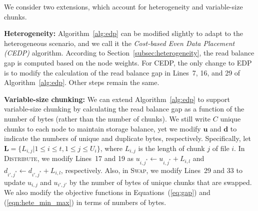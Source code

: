 We consider two extensions, which account for heterogeneity and variable-size
chunks. 

{\bf Heterogeneity:} Algorithm~\ref{alg:edp} can be modified slightly to adapt
to the heterogeneous scenario, and we call it the
\textit{Cost-based Even Data Placement (CEDP)} algorithm.  According to
Section~\ref{subsec:heterogeneity}, the read balance gap is computed based on
the node weights. 
For CEDP, the only change to EDP is to modify the calculation of the read
balance gap in Lines~7, 16, and 29 of Algorithm~\ref{alg:edp}.  Other steps
remain the same. 

{\bf Variable-size chunking:} We can extend Algorithm~\ref{alg:edp} to support
variable-size chunking by calculating the read balance gap as a function of
the number of bytes (rather than the number of chunks).  We still write $C$
unique chunks to each node to maintain storage balance, yet we modify
$\mathbf{u}$ and $\mathbf{d}$ to indicate the numbers of unique and duplicate
bytes, respectively.  Specifically, let $\mathbf{L} = \{L_{i,j}|1\le i\le t,
1\le j \le U_i\}$, where $L_{i,j}$ is the length of chunk $j$ of file $i$.  In
\textsc{Distribute}, we modify Lines~17 and 19 as $u_{i,j^*} \leftarrow
u_{i,j^*} + L_{i,l}$ and $d_{i',j^*} \leftarrow d_{i',j^*} + L_{i,l}$,
respectively.  Also, in \textsc{Swap}, we modify Lines~29 and 33 to update
$u_{i,j}$ and $u_{i',j'}$ by the number of bytes of unique chunks that are
swapped.  We also modify the objective functions in Equations~(\ref{eq:gap})
and (\ref{eqn:hete_min_max}) in terms of numbers of bytes. 


